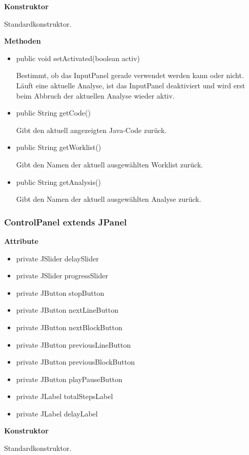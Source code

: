 \textbf{Konstruktor}\par
Standardkonstruktor.

\textbf{Methoden}
\begin{itemize}
	\item public void setActivated(boolean activ)\par
		Bestimmt, ob das InputPanel gerade verwendet werden kann oder nicht. Läuft eine aktuelle Analyse, ist das InputPanel deaktiviert und wird erst beim Abbruch der aktuellen Analyse wieder aktiv.
	\item public String getCode()\par
		Gibt den aktuell angezeigten Java-Code zurück.
	\item public String getWorklist()\par
		Gibt den Namen der aktuell ausgewählten Worklist zurück.
	\item public String getAnalysis()\par
		Gibt den Namen der aktuell ausgewählten Analyse zurück.
\end{itemize}

\subsubsection{ControlPanel extends JPanel}
\textbf{Attribute}
\begin{itemize}
	\item private JSlider delaySlider
	\item private JSlider progressSlider
	\item private JButton stopButton
	\item private JButton nextLineButton
	\item private JButton nextBlockButton
	\item private JButton previousLineButton
	\item private JButton previousBlockButton
	\item private JButton playPauseButton
	\item private JLabel totalStepsLabel
	\item private JLabel delayLabel
\end{itemize}

\textbf{Konstruktor}\par
Standardkonstruktor.

